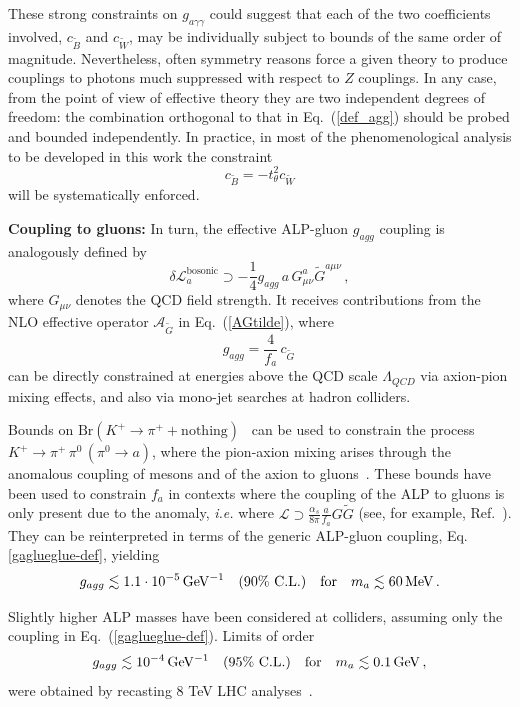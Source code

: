 \documentclass[11pt]{article}
\newcommand{\m}{\mu}
\renewcommand{\m}{\mu}
\newcommand{\n}{\nu}
\newcommand{\A}{\mathcal{A}}
\renewcommand{\L}{\mathcal{L}}
\newcommand{\Bt}{{\tilde{B}}}
\newcommand{\Wt}{{\tilde{W}}}
\newcommand{\cl}{\%\,\,  \text{C.L.}}
\renewcommand{\to}{\rightarrow}
\newcommand{\beq}{\begin{equation}}
\newcommand{\eeq}{\end{equation}}
\renewcommand{\[}{\begin{equation}}
\renewcommand{\]}{\end{equation}}
\newcommand{\LL}{\mathscr{L}}
\begin{document}
These strong constraints  on  
  $g_{a\gamma \gamma}$ could suggest that each of the two coefficients involved, $c_{\tilde{B}}$ and $c_{\tilde{W}}$, may be individually subject to bounds of the same order of magnitude. Nevertheless,  often symmetry reasons force a given theory to produce couplings to photons much suppressed with respect to $Z$ couplings. 
In any case, from the point of view of effective theory they are two independent degrees of freedom: the combination orthogonal to that in  Eq.~(\ref{def_agg}) should 
be probed and bounded independently. In practice, in most of the phenomenological analysis to be developed in this work the constraint 
\beq
 c_\Bt = -t_\theta^2 c_\Wt
 \label{cWB}
 \eeq
  will be systematically enforced.


\vspace{0.3cm}
{\bf Coupling to gluons: } In turn, the effective ALP-gluon $g_{agg}$ coupling is analogously defined by
\beq
 \delta\LL_a^{\text{bosonic}} \supset  - \frac{1}{4}g_{agg} \,a\,G_{\m\n}^a\tilde{G}^{a\m\n}\,,
  \label{gaglueglue-def}
 \eeq
  where $G_{\m\n}$ denotes the QCD field strength. It receives contributions from the NLO effective operator
   $\A_{\tilde{G}}$ in Eq.~(\ref{AGtilde}), where  
   \beq
g_{agg}=\frac{4}{f_a}\,c_{\tilde{G}} \,
 \eeq
    can  be directly constrained at energies 
above the QCD scale $\Lambda_{QCD}$ via axion-pion mixing effects, and also via mono-jet searches at hadron colliders. 


Bounds on $\mathrm{Br}(K^+ \to \pi^+ + \mathrm{nothing})$~\cite{Adler:2004hp} can be used to constrain the process $K^+ \to \pi^+ \,\pi^0 \,(\pi^0 \to a)$, 
where the pion-axion mixing arises through the anomalous coupling of mesons and of the axion to gluons~\cite{Choi:1986zw, Carena:1988kr}. These bounds 
have been used to constrain $f_a$ in contexts 
where the coupling of the ALP to gluons is only present due to the 
anomaly, \textit{i.e.} where $\L \supset \frac{\alpha_s}{8\pi}\frac{a}{f_a}G \tilde{G}$ (see, for example, Ref.~\cite{Fukuda:2015ana}). They can 
be reinterpreted in terms of the generic ALP-gluon coupling, Eq.\eqref{gaglueglue-def}, yielding
\[
g_{agg} \lesssim \unit[1.1\cdot10^{-5}]{GeV^{-1}} \quad (90\cl) \quad \text{for}\quad m_a \lesssim \unit[60]{MeV}\,.
\]





Slightly higher ALP masses  have been considered at colliders, assuming only the coupling in Eq.~(\ref{gaglueglue-def}). Limits of order
\[\label{a-f-5}
g_{agg} \lesssim \unit[10^{-4}]{GeV^{-1}}\quad (95\cl) 
\quad \text{for}\quad m_a \lesssim \unit[0.1]{GeV}\,, 
\]
were obtained \cite{Mimasu:2014nea} by recasting 8 TeV LHC 
analyses~\cite{Khachatryan:2014rra,Aad:2015zva}.
\vspace{0.3cm}
\end{document}
